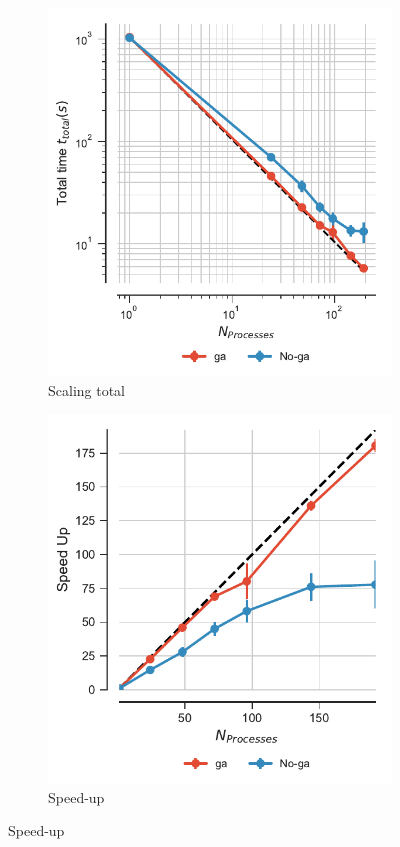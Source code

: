\begin{figure}[ht!]
\centering
\begin{subfigure}{.4\textwidth}
  \includegraphics[width=\linewidth]{figures/Comparison_tot_time_traj_splitting.pdf}
  \caption{Scaling total}
  \label{fig:MPIscaling-split}
\end{subfigure}
\hfill
\begin{subfigure}{.4\textwidth}
  \includegraphics[width=\linewidth]{figures/Comparison_Speed_UP_traj_splitting.pdf}
  \caption{Speed-up}
  \label{fig:MPIspeedup-split}
\end{subfigure}
\bigskip


\end{figure}
